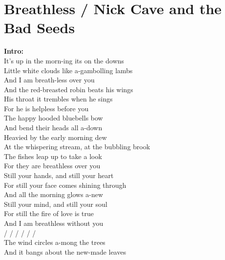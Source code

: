 \section{Breathless / Nick Cave and the Bad Seeds}\label{sec:breathless}

  \Cmajor
  \Gmajor
  \Fmajor
  
  
\textbf{Intro:}       \\
 It's up in the morn-ing its on the downs \\
Little white  clouds like a-gambolling  lambs\\
And I am breath-less over you \\
And the red-breasted  robin beats his  wings\\
His throat it  trembles when he sings \\
For he is  helpless before  you\\
The happy hooded  bluebells bow\\
And  bend their  heads all a-down \\
Heavied  by the early morning dew \\
At the whispering  stream, at the bubbling  brook\\
The fishes leap  up to take a  look\\
For they are  breathless over  you\\
Still your  hands, and still your  heart\\
For still your  face comes shining  through\\
And all the  morning glows a-new\\
Still your  mind, and still your  soul\\
For still the  fire of love is  true\\
And I am  breathless without  you\\
 /  /  / / /  /  \\
 The wind circles a-mong the trees\\
And it  bangs about the  new-made leaves \\
